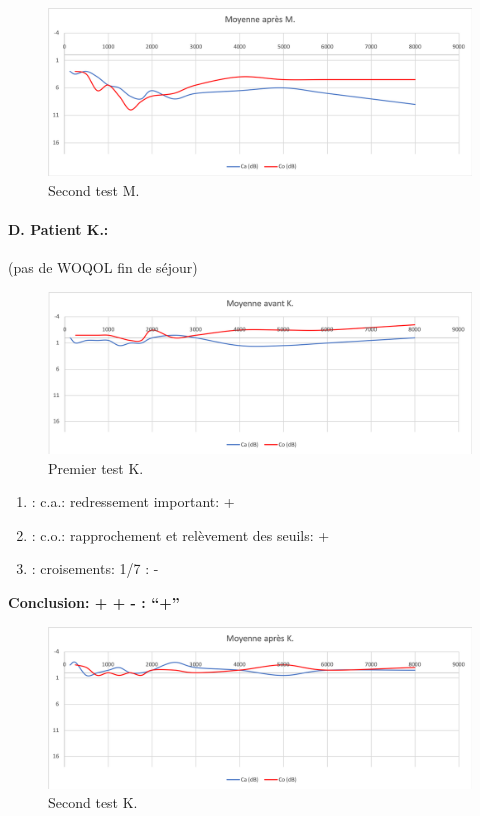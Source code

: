                         \begin{figure}
\centering
\includegraphics[width=0.7\linewidth]{images/graphiques/m_post.png}
\caption[Moyenne OG+OD]{Second test M.}
       
\label{groupecontroleimage1}
\end{figure}


                
\paragraph{D. Patient K.:}

  (pas de WOQOL fin de séjour)

        \begin{figure}
\centering
\includegraphics[width=0.7\linewidth]{images/graphiques/kad_pre.png}
\caption[Moyenne OG+OD]{Premier test K.}
       
\label{groupecontroleimage1}
\end{figure}
	\begin{enumerate}
 		
 		\item : c.a.: redressement important: +
                
 		\item : c.o.: rapprochement et relèvement des seuils: +
 		\item : croisements: 1/7 :  -
                  
                \end{enumerate}

                \textbf{  Conclusion:  + + -       : ``+''}

                 \begin{figure}
\centering
\includegraphics[width=0.7\linewidth]{images/graphiques/kad_post.png}
\caption[Moyenne OG+OD]{Second test K.}
       
\label{groupecontroleimage1}
\end{figure}
          
